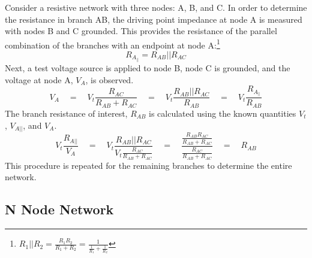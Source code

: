 \documentclass[11pt,twoside]{mitthesis}
\begin{document}
Consider a resistive network with three nodes: A, B, and C. 
In order to determine the resistance in branch AB, the driving point impedance at node A is measured with nodes B and C grounded. 
This provides the resistance of the parallel combination of the branches with an endpoint at node A:\footnote
{$
	\displaystyle R_{1}||R_{2} = 
	\frac{R_{1}R_{2}}{R_{1}+R_{2}} =
	\frac{1}{\frac{1}{R_1}+\frac{1}{R_2}}
$}
\begin{equation*}
R_{A_{||}} = R_{AB}||R_{AC}
\end{equation*}
Next, a test voltage source is applied to node B, node C is grounded, and the voltage at node A, $V_A$, is observed.
\begin{equation*}
V_{A} \quad=\quad V_t
\frac{R_{AC}} {R_{AB}+R_{AC}} \quad = \quad V_t
\frac{R_{AB}||R_{AC}} {R_{AB}} \quad = \quad V_t
\frac{R_{A_{||}}} {R_{AB}}
\end{equation*}
The branch resistance of interest, $R_{AB}$ is calculated using the known quantities $V_t$, $V_{A{||}}$, and $V_A$.
\begin{equation*}
V_t\frac{R_{A{||}}} {V_A}
\quad = \quad V_t\frac{R_{AB}||R_{AC}}{V_t\frac{R_{AC}}{R_{AB}+R_{AC}}}
\quad = \quad \frac{\frac{R_{AB}R_{AC}}{R_{AB}+R_{AC}}}{\frac{R_{AC}}{R_{AB}+R_{AC}}}
\quad = \quad R_{AB}
\end{equation*}
This procedure is repeated for the remaining branches to determine the entire network.

\subsection{N Node Network}
\end{document}
